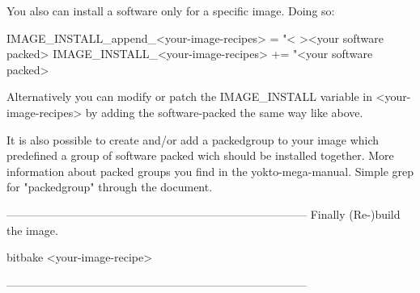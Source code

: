     You also can install a software only for a specific image. Doing so:

        IMAGE_INSTALL_append_<your-image-recipes> = "< ><your software packed>
        IMAGE_INSTALL_<your-image-recipes> += "<your software packed>

    Alternatively you can modify or patch the IMAGE_INSTALL variable
    in <your-image-recipes> by adding the software-packed the same way like
    above.

    It is also possible to create and/or add a packedgroup to your image which
    predefined a group of software packed wich should be installed together.
    More information about packed groups you find in the yokto-mega-manual.
    Simple grep for "packedgroup" through the document.


--------------------------------------------------------------------------------
Finally
    (Re-)build the image.

        bitbake <your-image-recipe>









--------------------------------------------------------------------------------

